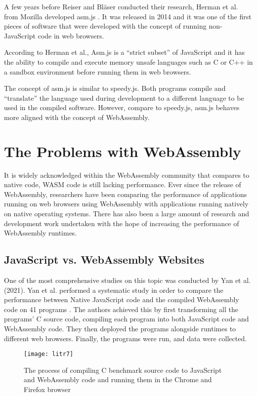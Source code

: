 A few years before Reiser and Bläser conducted their research, Herman et al. from Mozilla developed asm.js \cite{lit15}. It was released in 2014 and it was one of the first pieces of software that were developed with the concept of running non-JavaScript code in web browsers.

According to Herman et al., Asm.js is a “strict subset” of JavaScript and it has the ability to compile and execute memory unsafe languages such as C or C++ in a sandbox environment before running them in web browsers.

The concept of asm.js is similar to speedy.js. Both programs compile and “translate” the language used during development to a different language to be used in the compiled software. However, compare to speedy.js, asm.js behaves more aligned with the concept of WebAssembly.

\bigskip
\section{The Problems with WebAssembly}

It is widely acknowledged within the WebAssembly community that compares to native code, WASM code is still lacking performance. Ever since the release of WebAssembly, researchers have been comparing the performance of applications running on web browsers using WebAssembly with applications running natively on native operating systems. There has also been a large amount of research and development work undertaken with the hope of increasing the performance of WebAssembly runtimes.

\bigskip
\subsection{JavaScript vs. WebAssembly Websites}

One of the most comprehensive studies on this topic was conducted by Yan et al. (2021). Yan et al. performed a systematic study in order to compare the performance between Native JavaScript code and the compiled WebAssembly code on 41 programs \cite{lit16}. The authors achieved this by first transforming all the programs’ C source code, compiling each program into both JavaScript code and WebAssembly code. They then deployed the programs alongside runtimes to different web browsers. Finally, the programs were run, and data were collected.

\bigskip
\begin{figure}[hp]
\centering
\texttt{[image: litr7]}
\caption{\footnotesize{The process of compiling C benchmark source code to JavaScript and WebAssembly code and running them in the Chrome and Firefox browser \cite{lit16}}}
\captionsetup{aboveskip=0pt,font=it}
\end{figure}
\bigskip

